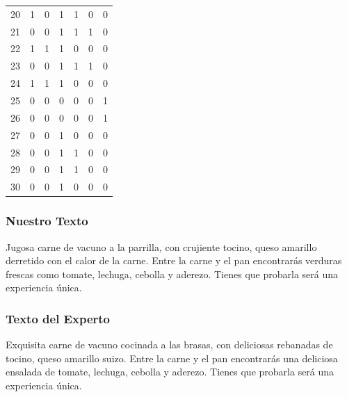 \begin{table}
\begin{tabular}{|r|c|c|c|c|c|c|}
20 &         1 &         0 &         1 &         1 &         0 &         0 \\
21 &         0 &         0 &         1 &         1 &         1 &         0 \\
22 &         1 &         1 &         1 &         0 &         0 &         0 \\
23 &         0 &         0 &         1 &         1 &         1 &         0 \\
24 &         1 &         1 &         1 &         0 &         0 &         0 \\
25 &         0 &         0 &         0 &         0 &         0 &         1 \\
26 &         0 &         0 &         0 &         0 &         0 &         1 \\
27 &         0 &         0 &         1 &         0 &         0 &         0 \\
28 &         0 &         0 &         1 &         1 &         0 &         0 \\
29 &         0 &         0 &         1 &         1 &         0 &         0 \\
30 &         0 &         0 &         1 &         0 &         0 &         0 

\end{tabular}
\end{table}



\subsubsection{Nuestro Texto}

Jugosa carne de vacuno  a la parrilla, con crujiente tocino, queso amarillo  derretido con el calor de la carne. Entre la carne y el pan encontrarás verduras frescas como tomate, lechuga, cebolla y aderezo. Tienes que probarla será una experiencia única.

\subsubsection{Texto del Experto}

Exquisita carne de vacuno  cocinada a las brasas, con deliciosas rebanadas de tocino, queso amarillo suizo. Entre la carne y el pan encontrarás una deliciosa ensalada de tomate, lechuga, cebolla y aderezo. Tienes que probarla será una experiencia única.

